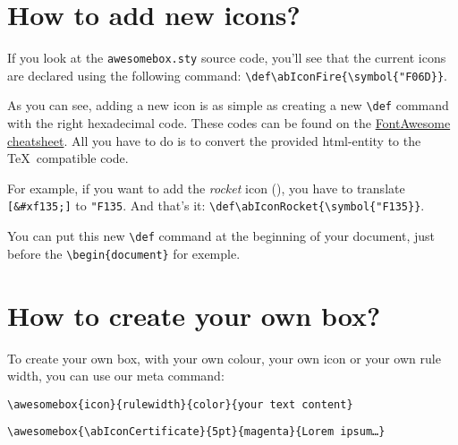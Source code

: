 \documentclass[a4paper,12pt]{article}
\def\abIconRocket{\symbol{"F135}}
\newcommand\hrefcolor[2]{\textcolor{magenta}{\href{#1}{#2}}}
\begin{document}
\section{How to add new icons?}
\label{sec:new-icons}

If you look at the \texttt{awesomebox.sty} source code, you'll see that
the current icons are declared using the following command:
\verb!\def\abIconFire{\symbol{"F06D}}!.

As you can see, adding a new icon is as simple as creating a new
\verb!\def! command with the right hexadecimal code. These codes can be
found on the \hrefcolor{http://fontawesome.io/cheatsheet/}{FontAwesome
  cheatsheet}. All you have to do is to convert the provided html-entity
to the \TeX\ compatible code.

For example, if you want to add the \emph{rocket} icon
({\ABFamily\abIconRocket}), you have to translate \verb![&#xf135;]! to
\texttt{"F135}. And that's it:
\verb!\def\abIconRocket{\symbol{"F135}}!.

You can put this new \verb!\def! command at the beginning of your
document, just before the \verb!\begin{document}! for exemple.

\section{How to create your own box?}

To create your own box, with your own colour, your own icon or your own
rule width, you can use our meta command:

\begin{center}
\verb!\awesomebox{icon}{rulewidth}{color}{your text content}!
\end{center}

\vspace{5mm}

\begin{center}
\verb!\awesomebox{\abIconCertificate}{5pt}{magenta}{Lorem ipsum…}!
\end{center}
\vspace{-5mm}

\end{document}
